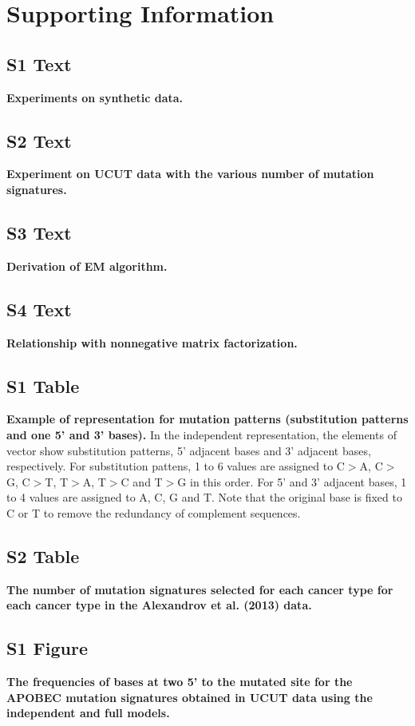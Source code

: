 \documentclass[10pt,letterpaper]{article}
\begin{document}
\section*{Supporting Information}
\subsection*{S1 Text}
\label{simulation}
{\bf Experiments on synthetic data.}

\subsection*{S2 Text}
\label{UCUT_supp}
{\bf Experiment on UCUT data with the various number of mutation signatures.}

\subsection*{S3 Text}
\label{EM_math}
{\bf Derivation of EM algorithm.}

\subsection*{S4 Text}
\label{NMF_math}
{\bf Relationship with nonnegative matrix factorization.}

\subsection*{S1 Table}
\label{mfexample}
{\bf Example of representation for mutation patterns (substitution patterns and one 5' and 3' bases).}
In the independent representation, the elements of vector show substitution patterns, 5' adjacent bases and 3' adjacent bases, respectively.
For substitution pattens, 1 to 6 values are assigned to C$>$A, C$>$G, C$>$T, T$>$A, T$>$C and T$>$G in this order.
For 5' and 3' adjacent bases, 1 to 4 values are assigned to A, C, G and T.
Note that the original base is fixed to C or T to remove the redundancy of complement sequences.

\subsection*{S2 Table}
\label{nature2013_sigNum}
{\bf The number of mutation signatures selected for each cancer type for each cancer type in the Alexandrov et al. (2013) data.}

\subsection*{S1 Figure}
\label{UCUT_APOBEC_twoFivePrime}
{\bf The frequencies of bases at two 5' to the mutated site for the APOBEC mutation signatures obtained in UCUT data using the independent and full models.}
\end{document}
